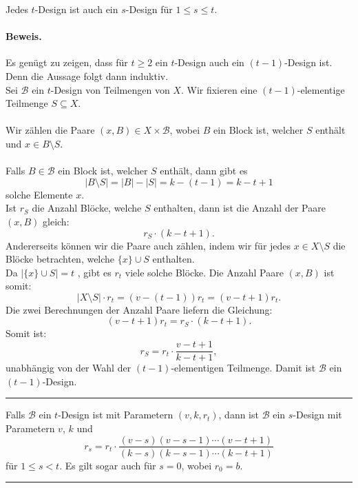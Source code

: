 \documentclass[9pt]{article}
\begin{document}
\begin{bsp}
 Jedes $t$-Design ist auch ein $s$-Design für $1 \leq s \leq t$.  
\explainvkrb
\paragraph{Beweis.} Es genügt zu zeigen, dass für $t \geq 2$ ein $t$-Design auch ein $(t - 1)$-Design ist. Denn die Aussage folgt dann induktiv.  \\
Sei $\mathcal{B}$ ein $t$-Design von Teilmengen von $X$. Wir fixieren eine $(t - 1)$-elementige Teilmenge $S \subseteq X$.   \\
 \\
Wir zählen die Paare $(x, B) \in X \times \mathcal{B}$, wobei $B$ ein Block ist, welcher $S$ enthält und $x \in B \setminus S$.  \\
 \\ 
Falls $B \in \mathcal{B}$ ein Block ist, welcher $S$ enthält, dann gibt es
\[
|B \setminus S| = |B| - |S| = k - (t - 1) = k - t + 1
\]
solche Elemente $x$.  \\
Ist $r_S$ die Anzahl Blöcke, welche $S$ enthalten, dann ist die Anzahl der Paare $(x, B)$ gleich:
\[
r_S \cdot (k - t + 1).
\]
Andererseits können wir die Paare auch zählen, indem wir für jedes $x \in X \setminus S$  die Blöcke betrachten, welche $\{x\} \cup S$ enthalten.  \\
Da $|\{x\} \cup S| = t$ , gibt es $r_t$ viele solche Blöcke. Die Anzahl Paare $(x, B)$ ist somit:
\[
|X \setminus S| \cdot r_t = (v - (t - 1)) r_t = (v - t + 1) r_t.
\]
Die zwei Berechnungen der Anzahl Paare liefern die Gleichung:
\[
(v - t + 1) r_t = r_S \cdot (k - t + 1).
\]
Somit ist:
\[
r_S = r_t \cdot \frac{v - t + 1}{k - t + 1},
\]
unabhängig von der Wahl der $(t - 1)$-elementigen Teilmenge. Damit ist $\mathcal{B}$ ein $(t - 1)$-Design.  
\end{bsp} \noindent \rule{8cm}{0.4pt}
\explaindesign
\begin{folg} \explainvkrb \explainrs
Falls $\mathcal{B}$ ein $t$-Design ist mit Parametern $(v, k, r_t)$, dann ist $\mathcal{B}$ ein $s$-Design mit Parametern $v$, $k$ und
\[
r_s = r_t \cdot \frac{(v - s)(v - s - 1) \cdots (v - t + 1)}{(k - s)(k - s - 1) \cdots (k - t + 1)}
\]
für $1 \leq s < t$. Es gilt sogar auch für $s = 0$, wobei $r_0 = b$.  
\end{folg} \noindent \rule{8cm}{0.4pt}
\end{document}
